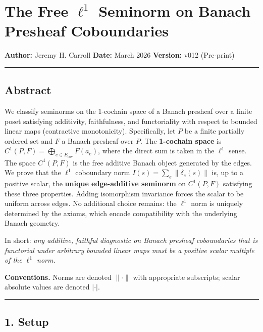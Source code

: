 \documentclass[
]{article}
\author{}
\date{}
\begin{document}
\section{\texorpdfstring{The Free \(\ell^1\) Seminorm on Banach Presheaf
Coboundaries}{The Free \textbackslash ell\^{}1 Seminorm on Banach Presheaf Coboundaries}}\label{the-free-ell1-seminorm-on-banach-presheaf-coboundaries}

\textbf{Author:} Jeremy H. Carroll \textbf{Date:} March 2026
\textbf{Version:} v012 (Pre-print)

\begin{center}\rule{0.5\linewidth}{0.5pt}\end{center}

\subsection{Abstract}\label{abstract}

We classify seminorms on the 1-cochain space of a Banach presheaf over a
finite poset satisfying additivity, faithfulness, and functoriality with
respect to bounded linear maps (contractive monotonicity). Specifically,
let \(P\) be a finite partially ordered set and \(F\) a Banach presheaf
over \(P\). The \textbf{1-cochain space} is
\(C^1(P, F) = \bigoplus_{e \in E_{\text{cov}}} F(a_e)\), where the
direct sum is taken in the \(\ell^1\) sense. The space \(C^1(P, F)\) is
the free additive Banach object generated by the edges. We prove that
the \(\ell^1\) coboundary norm \(I(s) = \sum_e \|\delta_e(s)\|\) is, up
to a positive scalar, the \textbf{unique edge-additive seminorm} on
\(C^1(P, F)\) satisfying these three properties. Adding isomorphism
invariance forces the scalar to be uniform across edges. No additional
choice remains: the \(\ell^1\) norm is uniquely determined by the
axioms, which encode compatibility with the underlying Banach geometry.

In short: \emph{any additive, faithful diagnostic on Banach presheaf
coboundaries that is functorial under arbitrary bounded linear maps must
be a positive scalar multiple of the \(\ell^1\) norm.}

\textbf{Conventions.} Norms are denoted \(\lVert \cdot \rVert\) with
appropriate subscripts; scalar absolute values are denoted \(|\cdot|\).

\begin{center}\rule{0.5\linewidth}{0.5pt}\end{center}

\subsection{1. Setup}\label{setup}
\end{document}

